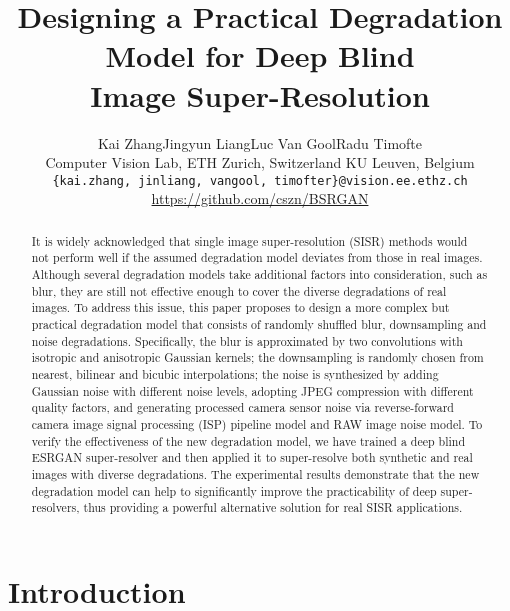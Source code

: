 \documentclass[10pt,twocolumn,letterpaper]{article}
\begin{document}
\title{Designing a Practical Degradation Model for Deep Blind\\ Image Super-Resolution}

\author{Kai Zhang\qquad\quad Jingyun Liang\qquad\quad  Luc Van Gool\qquad\quad  Radu Timofte\\
Computer Vision Lab, ETH Zurich, Switzerland \qquad KU Leuven, Belgium\\
{\tt\small \{kai.zhang, jinliang, vangool, timofter\}@vision.ee.ethz.ch}\\
\url{https://github.com/cszn/BSRGAN}
}

\maketitle


\begin{abstract}
It is widely acknowledged that single image super-resolution (SISR) methods would not perform well if the assumed degradation model deviates from those in real images. Although several degradation models take additional factors into consideration, such as blur, they are still not effective enough to cover the diverse degradations of real images. To address this issue, this paper proposes to design a more complex but practical degradation model that consists of randomly shuffled blur, downsampling and noise degradations. Specifically, the blur is approximated by two convolutions with isotropic and anisotropic Gaussian kernels; the downsampling is randomly chosen from nearest, bilinear and bicubic interpolations; the noise is synthesized by adding Gaussian noise with different noise levels, adopting JPEG compression with different quality factors, and generating processed camera sensor noise via reverse-forward camera image signal processing (ISP) pipeline model and RAW image noise model. To verify the effectiveness of the new degradation model, we have trained a deep blind ESRGAN super-resolver and then applied it to super-resolve both synthetic and real images with diverse degradations. The experimental results demonstrate that the new degradation model can help to significantly improve the practicability of deep super-resolvers, thus providing a powerful alternative solution for real SISR applications.
\end{abstract}

\section{Introduction}
\label{sec:introduction}
\end{document}
